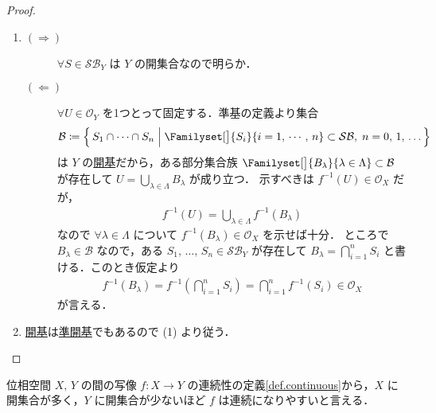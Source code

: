 \documentclass[geometry_main]{subfiles}
\begin{document}
\begin{proof}
    \begin{enumerate}
        \item 
        \begin{description}
            \item[\textbf{$\bm{(\Longrightarrow)}$}] $\forall S \in \mathcal{SB}_Y$ は $Y$ の開集合なので明らか．
            \item[\textbf{$\bm{(\Longleftarrow)}$}] $\forall U \in \mathscr{O}_Y$ を1つとって固定する．準基の定義より集合
            \begin{align}
                \mathcal{B} \coloneqq \Bigl\{\, S_1 \cap \cdots \cap S_n \Bigm| \Familyset[\big]{S_i}{i = 1,\, \cdots,\, n} \subset \mathcal{SB},\; n=0,\, 1,\, \dots \,\Bigr\}
            \end{align}
            は $Y$ の\hyperref[def.opbase]{開基}だから，ある部分集合族 $\Familyset[\big]{B_\lambda}{\lambda \in \Lambda} \subset \mathcal{B}$ が存在して $U = \bigcup_{\lambda \in \Lambda} B_\lambda$ が成り立つ．
            示すべきは $f^{-1}(U) \in \mathscr{O}_X$ だが，
            \begin{align}
                f^{-1}(U) = \bigcup_{\lambda \in \Lambda} f^{-1}(B_\lambda)
            \end{align}
            なので $\forall \lambda \in \Lambda$ について $f^{-1} (B_\lambda) \in \mathscr{O}_X$ を示せば十分．
            ところで $B_\lambda \in \mathscr{B}$ なので，ある $S_1,\, \dots ,\, S_n \in \mathcal{SB}_Y$ が存在して $B_\lambda = \bigcap_{i=1}^n S_i$ と書ける．このとき仮定より
            \begin{align}
                f^{-1}(B_\lambda) = f^{-1}\left( \bigcap_{i=1}^n S_i \right)  = \bigcap_{i=1}^n f^{-1}(S_i) \in \mathscr{O}_X
            \end{align}
            が言える．
        \end{description}
        \item \hyperref[def.opbase]{開基}は\hyperref[def:subbase]{準開基}でもあるので (1) より従う．
    \end{enumerate}
\end{proof}



位相空間 $X,\, Y$ の間の写像 $f \colon X \to Y$ の連続性の定義\ref{def.continuous}から，$X$ に開集合が多く，$Y$ に開集合が少ないほど $f$ は連続になりやすいと言える．
\end{document}
